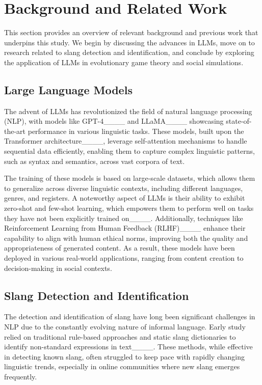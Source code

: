 \section{Background and Related Work}
\label{sec: RelatedWork}
This section provides an overview of relevant background and previous work that underpins this study. We begin by discussing the advances in LLMs, move on to research related to slang detection and identification, and conclude by exploring the application of LLMs in evolutionary game theory and social simulations.

\subsection{Large Language Models}
The advent of LLMs has revolutionized the field of natural language processing (NLP), with models like  GPT-4____ and LLaMA____ showcasing state-of-the-art performance in various linguistic tasks. These models, built upon the Transformer architecture____, leverage self-attention mechanisms to handle sequential data efficiently, enabling them to capture complex linguistic patterns, such as syntax and semantics, across vast corpora of text.


The training of these models is based on large-scale datasets, which allows them to generalize across diverse linguistic contexts, including different languages, genres, and registers. A noteworthy aspect of LLMs is their ability to exhibit zero-shot and few-shot learning, which empowers them to perform well on tasks they have not been explicitly trained on____. Additionally, techniques like Reinforcement Learning from Human Feedback (RLHF)____ enhance their capability to align with human ethical norms, improving both the quality and appropriateness of generated content. As a result, these models have been deployed in various real-world applications, ranging from content creation to decision-making in social contexts.

\subsection{Slang Detection and Identification}
The detection and identification of slang have long been significant challenges in NLP due to the constantly evolving nature of informal language. Early study relied on traditional rule-based approaches and static slang dictionaries to identify non-standard expressions in text____. These methods, while effective in detecting known slang, often struggled to keep pace with rapidly changing linguistic trends, especially in online communities where new slang emerges frequently.

